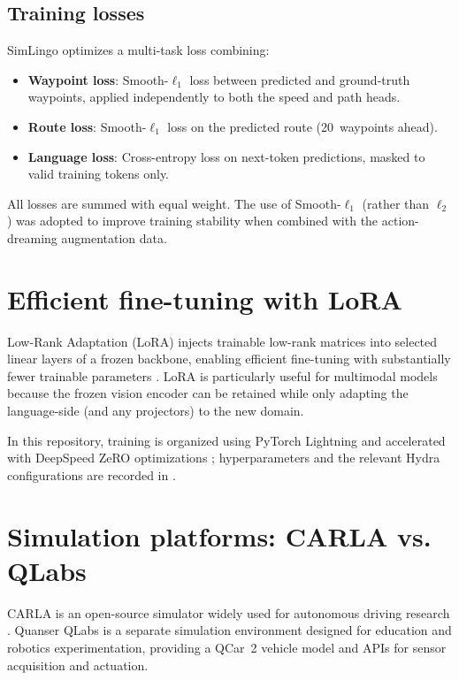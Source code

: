 \subsection{Training losses}
\label{sec:training-losses}
SimLingo optimizes a multi-task loss combining:
\begin{itemize}[leftmargin=*,itemsep=0.25em]
  \item \textbf{Waypoint loss}: Smooth-$\ell_1$ loss between predicted and ground-truth waypoints, applied independently to both the speed and path heads.
  \item \textbf{Route loss}: Smooth-$\ell_1$ loss on the predicted route (20~waypoints ahead).
  \item \textbf{Language loss}: Cross-entropy loss on next-token predictions, masked to valid training tokens only.
\end{itemize}
All losses are summed with equal weight. The use of Smooth-$\ell_1$ (rather than $\ell_2$) was adopted to improve training stability when combined with the action-dreaming augmentation data.

\section{Efficient fine-tuning with LoRA}
Low-Rank Adaptation (LoRA) injects trainable low-rank matrices into selected linear layers of a frozen backbone, enabling efficient fine-tuning with substantially fewer trainable parameters \citep{hu2021lora}. LoRA is particularly useful for multimodal models because the frozen vision encoder can be retained while only adapting the language-side (and any projectors) to the new domain.

In this repository, training is organized using PyTorch Lightning \citep{pytorchlightning} and accelerated with DeepSpeed ZeRO optimizations \citep{deepspeed}; hyperparameters and the relevant Hydra \citep{yadan2019hydra} configurations are recorded in .

\section{Simulation platforms: CARLA vs. QLabs}
CARLA is an open-source simulator widely used for autonomous driving research \citep{dosovitskiy2017carla}. Quanser QLabs is a separate simulation environment designed for education and robotics experimentation, providing a QCar~2 vehicle model and APIs for sensor acquisition and actuation.

